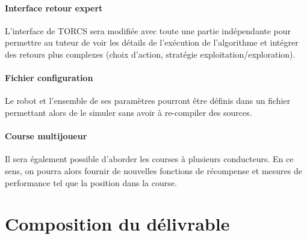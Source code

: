 \documentclass[a4paper,12pt]{article}
\begin{document}
	  \paragraph{Interface retour expert} L'interface de TORCS sera modifiée avec toute une partie indépendante
	  pour permettre au tuteur de voir les détails de l'exécution de l'algorithme et intégrer des retours plus 
	  complexes (choix d'action, stratégie exploitation/exploration).
	  \paragraph{Fichier configuration} Le robot et l'ensemble de ses paramètres pourront être
	  définis dans un fichier permettant alors de le simuler sans avoir à re-compiler des sources.
	  \paragraph{Course multijoueur} Il sera également possible d'aborder les courses à plusieurs conducteurs. En 
	  ce sens, on pourra alors fournir de nouvelles fonctions de récompense et mesures de performance
	  tel que la position dans la course.
	  
  
  \newpage
  \section{Composition du délivrable}
  
\end{document}
